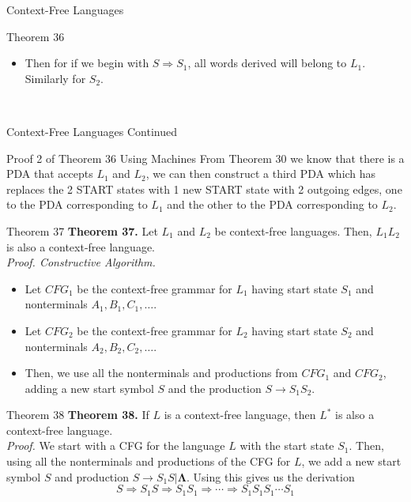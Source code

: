 \documentclass{article}
\begin{document}
\begin{multicols*}{3}
\begin{blackbox}{Context-Free Languages}
\begin{pinkbox}{Theorem 36}
\begin{itemize}[leftmargin=5pt]
            \item Then for if we begin with $S \Rightarrow S_1$, all words derived will belong to $L_1$. Similarly for $S_2$.
        \end{itemize}
    \end{pinkbox}\\[-2ex]
\end{blackbox}
\begin{blackbox}{Context-Free Languages Continued}
    \begin{pinkbox}{Proof 2 of Theorem 36 Using Machines}
        From Theorem 30 we know that there is a PDA that accepts $L_1$ and $L_2$, we can then construct a third PDA which has replaces the 2 START states with 1 new START state with 2 outgoing edges, one to the PDA corresponding to $L_1$ and the other to the PDA corresponding to $L_2$.
    \end{pinkbox}
    \begin{brownbox}{Theorem 37}
       \textbf{Theorem 37.} Let $L_1$ and $L_2$ be context-free languages. Then, $L_1L_2$ is also a context-free language.\\[1ex]
        \textit{Proof. Constructive Algorithm.} 
        \begin{itemize}[leftmargin=7pt]
            \item Let $CFG_1$ be the context-free grammar for $L_1$ having start state $S_1$ and nonterminals $A_1,B_1,C_1,\ldots$.
            \item Let $CFG_2$ be the context-free grammar for $L_2$ having start state $S_2$ and nonterminals $A_2,B_2,C_2,\ldots$.
            \item Then, we use all the nonterminals and productions from $CFG_1$ and $CFG_2$, adding a new start symbol $S$ and the production $S \rightarrow S_1S_2$.
        \end{itemize}
    \end{brownbox}
    \begin{redbox}{Theorem 38}
        \textbf{Theorem 38.} If $L$ is a context-free language, then $L^*$ is also a context-free language.\\[1ex]
        \textit{Proof.} We start with a CFG for the language $L$ with the start state $S_1$. Then, using all the nonterminals and productions of the CFG for $L$, we add a new start symbol $S$ and production $S \rightarrow S_1S|\boldsymbol{\Lambda}$. Using this gives us the derivation \\[-2.75ex]
        \[S \Rightarrow S_1S \Rightarrow S_1S_1 \Rightarrow \cdots \Rightarrow S_1S_1S_1\cdots S_1\] 

\end{redbox}
\end{blackbox}
\end{multicols*}
\end{document}
